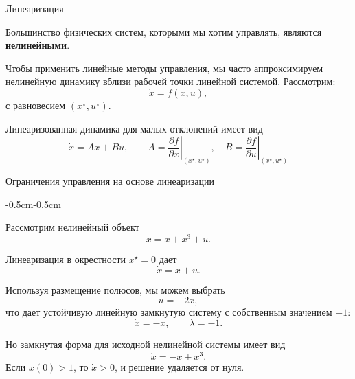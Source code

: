 \documentclass{beamer}
\begin{document}
	\begin{frame}{Линеаризация}
		\begin{flushleft}
			
			Большинство физических систем, которыми мы хотим управлять, являются \textbf{нелинейными}.
			
			\bigskip
			
			Чтобы применить линейные методы управления, мы часто аппроксимируем нелинейную
			динамику вблизи рабочей точки линейной системой. Рассмотрим:
			\[
			\dot{x}=f(x,u),
			\]
			с равновесием \((x^\star,u^\star)\).
			
			\bigskip
			
			Линеаризованная динамика для малых отклонений имеет вид
			\[
			\dot{x}=Ax+Bu,
			\qquad
			A=\left.\frac{\partial f}{\partial x}\right|_{(x^\star,u^\star)},
			\quad
			B=\left.\frac{\partial f}{\partial u}\right|_{(x^\star,u^\star)}
			\]
			
		\end{flushleft}
	\end{frame}
	
	\begin{frame}{Ограничения управления на основе линеаризации}
		\begin{flushleft}
			\begin{adjustwidth}{-0.5cm}{-0.5cm}
			
			Рассмотрим нелинейный объект
			\[
			\dot{x}=x+x^3+u.
			\]
			
			Линеаризация в окрестности \(x^\star=0\) дает
			\[
			\dot{x}=x+u.
			\]
			
			Используя размещение полюсов, мы можем выбрать
			\[
			u=-2x,
			\]
			что дает устойчивую линейную замкнутую систему с собственным значением \(-1\):
			\[
			\dot{x}=-x,
			\qquad \lambda=-1.
			\]
			
			Но замкнутая форма для исходной нелинейной системы имеет вид
			\[
			\dot{x}=-x+x^3.
			\]
			Если \(x(0)>1\), то \(\dot{x}>0\), и решение удаляется от нуля.
			
			\end{adjustwidth}
		\end{flushleft}
	\end{frame}
	
\end{document}
